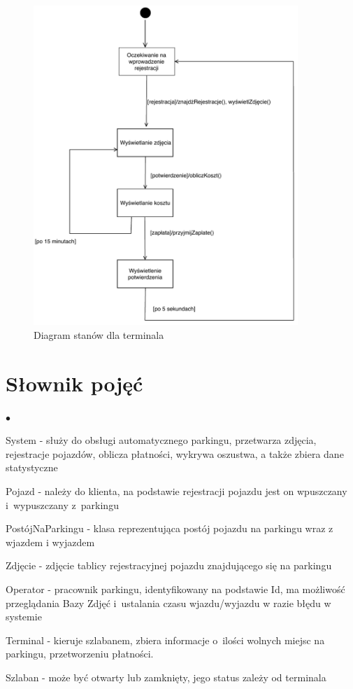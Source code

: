 \begin{figure}[H]
	\centering
	\includegraphics[width=100mm]{diagramy/DiagStanTerminal.pdf}
	\caption{Diagram stanów dla terminala \label{overflow}}
\end{figure}




\section{Słownik pojęć}
\label{sec:slownik}

\begin{list}{$\bullet$}{}
\item System - służy do obsługi automatycznego parkingu, przetwarza zdjęcia, rejestracje pojazdów, oblicza płatności, wykrywa oszustwa, a także zbiera dane statystyczne
\item Pojazd - należy do klienta, na podstawie rejestracji pojazdu jest on wpuszczany i~wypuszczany z~parkingu
\item PostójNaParkingu - klasa reprezentująca postój pojazdu na parkingu wraz z wjazdem i wyjazdem
\item Zdjęcie - zdjęcie tablicy rejestracyjnej pojazdu znajdującego się na parkingu
\item Operator - pracownik parkingu, identyfikowany na podstawie Id, ma możliwość przeglądania Bazy Zdjęć i~ustalania czasu wjazdu/wyjazdu w razie błędu w systemie
\item Terminal - kieruje szlabanem, zbiera informacje o~ilości wolnych miejsc na parkingu, przetworzeniu płatności.
\item Szlaban - może być otwarty lub zamknięty, jego status zależy od terminala
\end{list}
